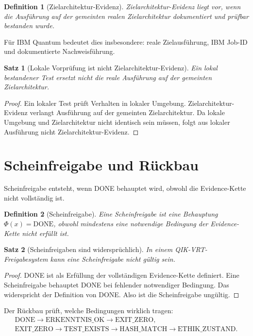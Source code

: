\documentclass[11pt,a4paper,oneside]{scrartcl}
\theoremstyle{qikstyle}
\newtheorem{definition}{Definition}[section]
\newtheorem{satz}{Satz}[section]
\newcommand{\DONE}{\mathrm{DONE}}
\newcommand{\HASH}{\mathrm{HASH\_MATCH}}
\newcommand{\TEST}{\mathrm{TEST\_EXISTS}}
\newcommand{\EXIT}{\mathrm{EXIT\_ZERO}}
\newcommand{\ERK}{\mathrm{ERKENNTNIS\_OK}}
\newcommand{\ETH}{\mathrm{ETHIK\_ZUSTAND}}
\newcommand{\Phiop}{\Phi}
\begin{document}
\begin{definition}[Zielarchitektur-Evidenz]
Zielarchitektur-Evidenz liegt vor, wenn die Ausführung auf der gemeinten realen Zielarchitektur dokumentiert und prüfbar bestanden wurde.
\end{definition}

Für IBM Quantum bedeutet dies insbesondere: reale Zielausführung, IBM Job-ID und dokumentierte Nachweisführung.

\begin{satz}[Lokale Vorprüfung ist nicht Zielarchitektur-Evidenz]
Ein lokal bestandener Test ersetzt nicht die reale Ausführung auf der gemeinten Zielarchitektur.
\end{satz}

\begin{proof}
Ein lokaler Test prüft Verhalten in lokaler Umgebung. Zielarchitektur-Evidenz verlangt Ausführung auf der gemeinten Zielarchitektur. Da lokale Umgebung und Zielarchitektur nicht identisch sein müssen, folgt aus lokaler Ausführung nicht Zielarchitektur-Evidenz.
\end{proof}
\newpage

\section{Scheinfreigabe und Rückbau}

Scheinfreigabe entsteht, wenn DONE behauptet wird, obwohl die Evidence-Kette nicht vollständig ist.

\begin{definition}[Scheinfreigabe]
Eine Scheinfreigabe ist eine Behauptung \(\Phiop(x)=\DONE\), obwohl mindestens eine notwendige Bedingung der Evidence-Kette nicht erfüllt ist.
\end{definition}

\begin{satz}[Scheinfreigaben sind widersprüchlich]
In einem QIK-VRT-Freigabesystem kann eine Scheinfreigabe nicht gültig sein.
\end{satz}

\begin{proof}
DONE ist als Erfüllung der vollständigen Evidence-Kette definiert. Eine Scheinfreigabe behauptet DONE bei fehlender notwendiger Bedingung. Das widerspricht der Definition von DONE. Also ist die Scheinfreigabe ungültig.
\end{proof}

Der Rückbau prüft, welche Bedingungen wirklich tragen:
\[
\begin{gathered}
\DONE \to \ERK \to \EXIT,\\
\EXIT \to \TEST \to \HASH \to \ETH.
\end{gathered}
\]
\end{document}
